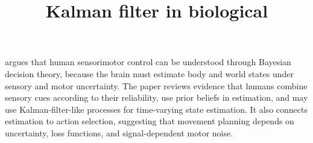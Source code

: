 \documentclass[a4paper]{article}
\title{Kalman filter in biological}
\date{}
\begin{document}
    \maketitle
    \cite{wolpert-2007-probabilistic-models-in-human-sensorimotor-control} argues that human sensorimotor control can be understood through Bayesian decision theory, because the brain must estimate body and world states under sensory and motor uncertainty. The paper reviews evidence that humans combine sensory cues according to their reliability, use prior beliefs in estimation, and may use Kalman-filter-like processes for time-varying state estimation. It also connects estimation to action selection, suggesting that movement planning depends on uncertainty, loss functions, and signal-dependent motor noise.
    
    
\end{document}
